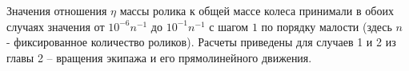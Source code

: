 Значения отношения $\eta$ массы ролика к общей массе колеса принимали в обоих случаях значения от $10^{-6}n^{-1}$ до $10^{-1}n^{-1}$ с шагом $1$ по порядку малости (здесь $n$ - фиксированное количество роликов).
Расчеты приведены для случаев 1 и 2 из главы 2 -- вращения экипажа и его прямолинейного движения.

%




